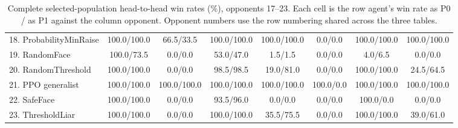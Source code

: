 \begin{table}[!ht]
{\begin{tabular}{lccccccc}
18. ProbabilityMinRaise & 100.0/100.0 & 66.5/33.5 & 100.0/100.0 & 100.0/100.0 & 0.0/0.0 & 100.0/100.0 & 100.0/100.0 \\
19. RandomFace & 100.0/73.5 & 0.0/0.0 & 53.0/47.0 & 1.5/1.5 & 0.0/0.0 & 4.0/6.5 & 0.0/0.0 \\
20. RandomThreshold & 100.0/100.0 & 0.0/0.0 & 98.5/98.5 & 19.0/81.0 & 0.0/0.0 & 100.0/100.0 & 24.5/64.5 \\
21. PPO generalist & 100.0/100.0 & 100.0/100.0 & 100.0/100.0 & 100.0/100.0 & 100.0/0.0 & 100.0/100.0 & 100.0/100.0 \\
22. SafeFace & 100.0/100.0 & 0.0/0.0 & 93.5/96.0 & 0.0/0.0 & 0.0/0.0 & 100.0/0.0 & 0.0/0.0 \\
23. ThresholdLiar & 100.0/100.0 & 0.0/0.0 & 100.0/100.0 & 35.5/75.5 & 0.0/0.0 & 100.0/100.0 & 39.0/61.0 \\
\bottomrule
\end{tabular}}
\caption{Complete selected-population head-to-head win rates (\%), opponents 17--23. Each cell is the row agent's win rate as P0 / as P1 against the column opponent. Opponent numbers use the row numbering shared across the three tables.}
\end{table}
\clearpage

